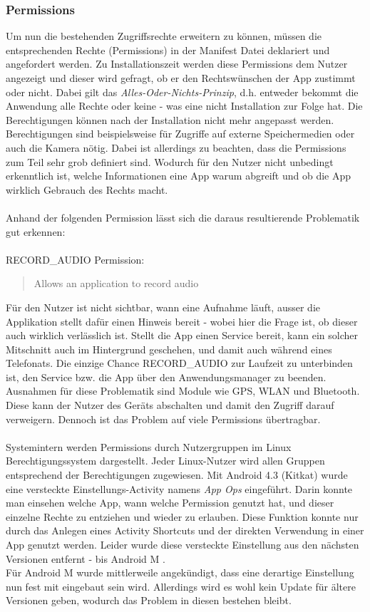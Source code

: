 	\subsubsection{Permissions}
	Um nun die bestehenden Zugriffsrechte erweitern zu können, müssen die entsprechenden Rechte (Permissions) in der Manifest Datei deklariert und angefordert werden. Zu Installationszeit werden diese Permissions dem Nutzer angezeigt und dieser wird gefragt, ob er den Rechtswünschen der App zustimmt oder nicht. Dabei gilt das \textit{Alles-Oder-Nichts-Prinzip}, d.h. entweder bekommt die Anwendung alle Rechte oder keine - was eine nicht Installation zur Folge hat. Die Berechtigungen können nach der Installation nicht mehr angepasst werden. Berechtigungen sind beispielsweise für Zugriffe auf externe Speichermedien oder auch die Kamera nötig. Dabei ist allerdings zu beachten, dass die Permissions zum Teil sehr grob definiert sind. Wodurch für den Nutzer nicht unbedingt erkenntlich ist, welche Informationen eine App warum abgreift und ob die App wirklich Gebrauch des Rechts macht.\\\\
	Anhand der folgenden Permission lässt sich die daraus resultierende Problematik gut erkennen:\\\\
	RECORD\_AUDIO Permission:
	\begin{quote}
	Allows an application to record audio \cite{RECORD_AUDIO}
	\end{quote} 
	Für den Nutzer ist nicht sichtbar, wann eine Aufnahme läuft, ausser die Applikation stellt dafür einen Hinweis bereit - wobei hier die Frage ist, ob dieser auch wirklich verlässlich ist. Stellt die App einen Service bereit, kann ein solcher Mitschnitt auch im Hintergrund geschehen, und damit auch während eines Telefonats. Die einzige Chance RECORD\_AUDIO zur Laufzeit zu unterbinden ist, den Service bzw. die App über den Anwendungsmanager zu beenden.	Ausnahmen für diese Problematik sind Module wie GPS, WLAN und Bluetooth. Diese kann der Nutzer des Geräts abschalten und damit den Zugriff darauf verweigern.
	Dennoch ist das Problem auf viele Permissions übertragbar.\\\\
	Systemintern werden Permissions durch Nutzergruppen im Linux Berechtigungssystem dargestellt\cite[S. 28]{Drake2014}. Jeder Linux-Nutzer wird allen Gruppen entsprechend der Berechtigungen zugewiesen.
	Mit Android 4.3 (Kitkat) wurde eine versteckte Einstellungs-Activity namens \textit{App Ops} eingeführt. Darin konnte man einsehen welche App, wann welche Permission genutzt hat, und dieser einzelne Rechte zu entziehen und wieder zu erlauben. Diese Funktion konnte nur durch das Anlegen eines Activity Shortcuts und der direkten Verwendung in einer App genutzt werden. Leider wurde diese versteckte Einstellung aus den nächsten Versionen entfernt - bis Android M \cite{HiddenActivity}. \\
	Für Android M wurde mittlerweile angekündigt, dass eine derartige Einstellung nun fest mit eingebaut sein wird\cite{AndroidMPermission}. Allerdings wird es wohl kein Update für ältere Versionen geben, wodurch das Problem in diesen bestehen bleibt.
	
